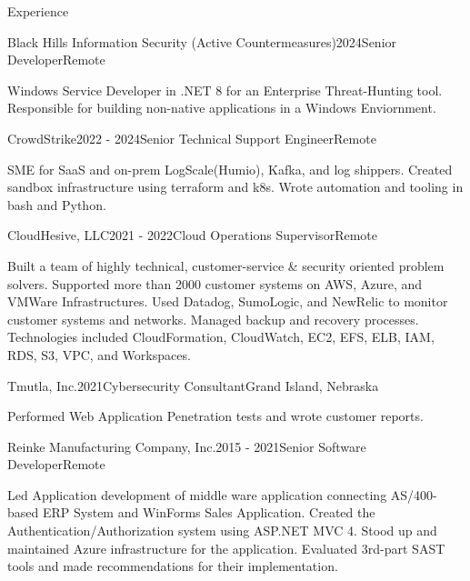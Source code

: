 \documentclass{resume} %
\begin{document}

\begin{rSection}{Experience}

\begin{rSubsection}{Black Hills Information Security (Active Countermeasures)}{2024}{Senior Developer}{Remote}
	\item Windows Service Developer in .NET 8 for an Enterprise Threat-Hunting tool. Responsible for building non-native applications in a Windows Enviornment.
\end{rSubsection}

\begin{rSubsection}{CrowdStrike}{2022 - 2024}{Senior Technical Support Engineer}{Remote}
	\item SME for SaaS and on-prem LogScale(Humio), Kafka, and log shippers. Created sandbox infrastructure using terraform and k8s. Wrote automation and tooling in bash and Python.
\end{rSubsection}

\begin{rSubsection}{CloudHesive, LLC}{2021 - 2022}{Cloud Operations Supervisor}{Remote}
\item Built a team of highly technical, customer-service \& security oriented problem solvers. Supported more than 2000 customer systems on AWS, Azure, and VMWare Infrastructures. Used Datadog, SumoLogic, and NewRelic to monitor customer systems and networks. Managed backup and recovery processes. Technologies included CloudFormation, CloudWatch, EC2, EFS, ELB, IAM, RDS, S3, VPC, and Workspaces.  
\end{rSubsection}

\begin{rSubsection}{Tmutla, Inc.}{2021}{Cybersecurity Consultant}{Grand Island, Nebraska}
\item Performed Web Application Penetration tests and wrote customer reports.
\end{rSubsection}

\begin{rSubsection}{Reinke Manufacturing Company, Inc.}{2015 - 2021}{Senior Software Developer}{Remote} 
\item Led Application development of middle ware application connecting AS/400-based ERP System and WinForms Sales Application. Created the Authentication/Authorization system using ASP.NET MVC 4. Stood up and maintained Azure infrastructure for the application. Evaluated 3rd-part SAST tools and made recommendations for their implementation.
\end{rSubsection}

\end{rSection}
\end{document}

